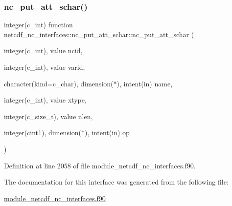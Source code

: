 \subsubsection{\texorpdfstring{nc\+\_\+put\+\_\+att\+\_\+schar()}{nc\_put\_att\_schar()}}
{\footnotesize\ttfamily integer(c\+\_\+int) function netcdf\+\_\+nc\+\_\+interfaces\+::nc\+\_\+put\+\_\+att\+\_\+schar\+::nc\+\_\+put\+\_\+att\+\_\+schar (\begin{DoxyParamCaption}\item[{integer(c\+\_\+int), value}]{ncid,  }\item[{integer(c\+\_\+int), value}]{varid,  }\item[{character(kind=c\+\_\+char), dimension($\ast$), intent(in)}]{name,  }\item[{integer(c\+\_\+int), value}]{xtype,  }\item[{integer(c\+\_\+size\+\_\+t), value}]{nlen,  }\item[{integer(cint1), dimension($\ast$), intent(in)}]{op }\end{DoxyParamCaption})}



Definition at line 2058 of file module\+\_\+netcdf\+\_\+nc\+\_\+interfaces.\+f90.



The documentation for this interface was generated from the following file\+:\begin{DoxyCompactItemize}
\item 
\hyperlink{module__netcdf__nc__interfaces_8f90}{module\+\_\+netcdf\+\_\+nc\+\_\+interfaces.\+f90}\end{DoxyCompactItemize}
